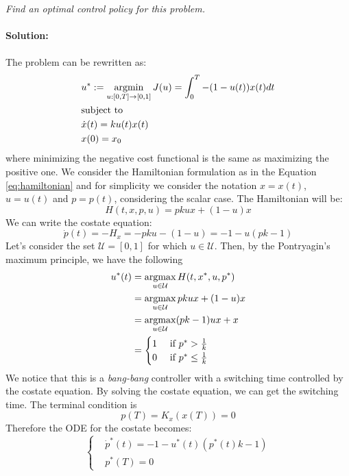 \emph{Find an optimal control policy for this problem.}
\\
\\
\textbf{Solution:}\\
\\
The problem can be rewritten as:
\begin{align}
    &u^* := \operatorname*{argmin}_{u:[0,T] \to [0,1]} J(u) = \int_0^T -(1-u(t))x(t)dt \\
    &\text{subject to}\\
    &\Dot{x}(t) = ku(t)x(t)\\
    &x(0)=x_0
\end{align}
where minimizing the negative cost functional is the same as maximizing the positive one.
We consider the Hamiltonian formulation as in the Equation \ref{eq:hamiltonian} and for simplicity we consider the notation $x = x(t)$, $u = u(t)$ and $p = p(t)$, considering the scalar case. The Hamiltonian will be:
\begin{equation}
    H(t, x, p, u) = p k u x + (1-u)x
\end{equation}
We can write the costate equation:
\begin{equation}
    \Dot{p}(t) = - H_x = -pku - (1 -u)  = -1 -u(pk - 1)
\end{equation}
Let's consider the set $\mathcal{U} = [0, 1]$ for which $u \in \mathcal{U}$. Then, by the Pontryagin's maximum principle, we have the following
\begin{align}
    u^*(t) &= \operatorname*{argmax}_{u \in \mathcal{U}} H (t, x^*, u, p^*)\\
    &= \operatorname*{argmax}_{u \in \mathcal{U}} p k u x + (1-u)x\\
    &= \operatorname*{argmax}_{u \in \mathcal{U}} (pk-1)ux + x\\
    &=  \begin{cases}
        1 &\text{ if } p^* > \frac{1}{k} \\
        0 &\text{ if } p^* \leq \frac{1}{k}\\
    \end{cases} 
\end{align}
We notice that this is a \emph{bang-bang} controller with a switching time controlled by the costate equation. By solving the costate equation, we can get the switching time. The terminal condition is
\begin{equation}
    p(T) = K_x(x(T)) = 0
\end{equation}
Therefore the ODE for the costate becomes:\\
\begin{equation}
    \begin{cases}
        &\Dot{p}^*(t) = -1 -u^*(t)(p^*(t)k - 1)\\
        &p^*(T) = 0
    \end{cases}
\end{equation}

